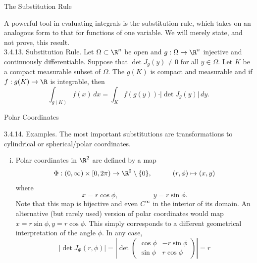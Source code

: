 \documentclass[smaller,hyperref={CJKbookmarks=true}]{beamer}
\begin{document}
\begin{frame}[c]{The Substitution Rule}
\begin{spacing}{1.15}
A powerful tool in evaluating integrals is the substitution rule, which takes
on an analogous form to that for functions of one variable. We will merely
state, and not prove, this result.\\[5pt]
\alert{3.4.13. Substitution Rule.} Let $\Omega\subset\R^n$ be open and $g:\Omega\to\R^n$ injective and continuously dif{}ferentiable. Suppose that $\det J_g(y)\neq0$ for all $y\in\Omega$. Let $K$ be a compact measurable subset of $\Omega$. The $g(K)$ is compact and measurable and if $f:g(K)\to\R$ is integrable, then
\[\int_{g(K)}f(x)\,dx=\int_Kf(g(y))\cdot
\vert\det J_g(y)\vert\,dy.\]
\end{spacing}
\end{frame}
\begin{frame}[t]{Polar Coordinates}
\begin{spacing}{1.05}
\alert{3.4.14. Examples.} The most important substitutions are transformations to
cylindrical or spherical/polar coordinates.
\begin{enumerate}[(i)]
  \item Polar coordinates in $\R^2$ are defined by a map
      \[\Phi:(0,\infty)\times[0,2\pi)\to\R^2\setminus\{0\},
      \qquad\quad(r,\phi)\mapsto(x,y)\]
      where
      \[x=r\cos\phi,\qquad\qquad\quad
      y=r\sin\phi.\]
      Note that this map is bijective and even $C^\infty$ in the interior of its
domain. An alternative (but rarely used) version of polar coordinates
would map $x=r\sin\phi,y=r\cos\phi$. This simply corresponds to a
dif{}ferent geometrical interpretation of the angle $\phi$. In any case,
\[|\det J_\Phi(r,\phi)|=\left|\det\begin{pmatrix}
                            \cos\phi & -r\sin\phi \\
                            \sin\phi & r\cos\phi
                          \end{pmatrix}\right|=r\]
\end{enumerate}
\end{spacing}
\end{frame}
\end{document}
